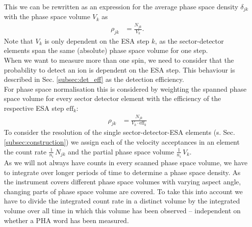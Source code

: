 This we can be rewritten as an expression for the average phase space density $\delta_{jk}$ with the phase space volume $V_{k}$ as 
\begin{align*}
\rho_{jk} &= \frac{N_{jk}}{V_{k}}.
\end{align*}
Note that $V_{k}$ is only dependent on the ESA step $k$, as the sector-detector elements span the same (absolute) phase space volume for one step.\\
When we want to measure more than one spin, we need to consider that the probability to detect an ion is dependent on the ESA step. This behaviour is described in Sec. \ref{subsec:det_eff} as the detection efficiency.\\
For phase space normalisation this is considered by weighting the spanned phase space volume for every sector detector element with the efficiency of the respective ESA step $\mathrm{eff}_k$: 
\begin{align*}
\rho_{jk} &= \frac{N_{jk}}{V_{k}\cdot \mathrm{eff}_k}
\end{align*}
To consider the resolution of the single sector-detector-ESA elements (s. Sec. \ref{subsec:construction}) we assign each of the velocity acceptances in an element the count rate $\frac{1}{n_i}\, N_{jk}$ and the partial phase space volume $\frac{1}{n_i} \, V_{k}$.\\
As we will not always have counts in every scanned phase space volume, we have to integrate over longer periods of time to determine a phase space density.
As the instrument covers different phase space volumes with varying aspect angle, changing parts of phase space volume are covered. To take this into account we have to divide the integrated count rate in a distinct volume by the integrated volume over all time in which this volume has been observed -- independent on whether a PHA word has been measured.








